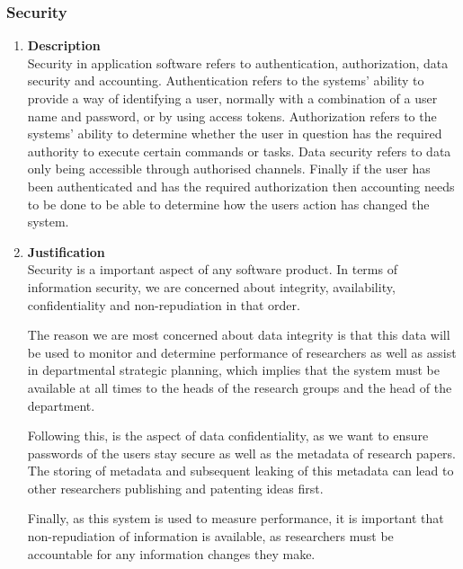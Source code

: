 \documentclass[a4paper,10pt]{article}
\begin{document}
	\subsubsection{Security}
		\begin{enumerate}
			\item \textbf{Description} \\
				Security in application software refers to authentication, authorization, data security and accounting. Authentication refers to the systems' ability to provide a way of identifying a user, normally with a combination of a user name and password, or by using access tokens. Authorization refers to the systems' ability to determine whether the user in question has the required authority to execute certain commands or tasks. Data security refers to data only being accessible through authorised channels. Finally if the user has been authenticated and has the required authorization then accounting needs to be done to be able to determine how the users action has changed the system.  

			\item \textbf{Justification} \\
				Security is a important aspect of any software product. In terms of information security, we are concerned about integrity, availability, confidentiality and non-repudiation in that order. 

				The reason we are most concerned about data integrity is that this data will be used to monitor and determine performance of researchers as well as assist in departmental strategic planning, which implies that the system must be available at all times to the heads of the research groups and the head of the department. 

				Following this, is the aspect of data confidentiality, as we want to ensure passwords of the users stay secure as well as the metadata of research papers. The storing of metadata and subsequent leaking of this metadata can lead to other researchers publishing and patenting ideas first.

				Finally, as this system is used to measure performance, it is important that non-repudiation of information is available, as researchers must be accountable for any information changes they make.


\end{enumerate}
\end{document}
